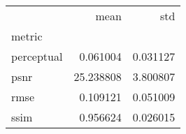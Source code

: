 \begin{tabular}{lrr}
\toprule
{} &       mean &       std \\
metric     &            &           \\
\midrule
perceptual &   0.061004 &  0.031127 \\
psnr       &  25.238808 &  3.800807 \\
rmse       &   0.109121 &  0.051009 \\
ssim       &   0.956624 &  0.026015 \\
\bottomrule
\end{tabular}
